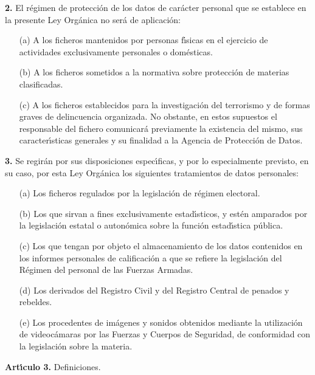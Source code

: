 {\bf 2.} El r\'egimen de protecci\'on de los datos de car\'acter personal que 
se establece en la presente Ley Org\'anica no ser\'a de aplicaci\'on:
\begin{itemize}
\item [(a)] A los ficheros mantenidos por personas f\'{\i}sicas en el ejercicio 
de actividades exclusivamente personales o dom\'esticas.
\item [(b)] A los ficheros sometidos a la normativa sobre protecci\'on de 
 materias clasificadas.
\item [(c)] A los ficheros establecidos para la investigaci\'on del terrorismo 
y de formas graves de delincuencia organizada. No obstante, en estos supuestos 
el responsable del fichero comunicar\'a previamente la existencia del mismo,
sus caracter\'{\i}sticas generales y su finalidad a la Agencia de Protecci\'on 
de Datos.
\end{itemize}

{\bf 3.} Se regir\'an por sus disposiciones espec\'{\i}ficas, y por lo 
especialmente previsto, en su caso, por esta Ley Org\'anica los siguientes 
tratamientos de datos personales:
\begin{itemize}
\item [(a)] Los ficheros regulados por la legislaci\'on de r\'egimen electoral.
\item [(b)] Los que sirvan a fines exclusivamente estad\'{\i}sticos, y est\'en 
amparados por la legislaci\'on estatal o auton\'omica sobre la funci\'on 
estad\'{\i}stica p\'ublica.
\item [(c)] Los que tengan por objeto el almacenamiento de los datos contenidos 
en los informes personales de calificaci\'on a que se refiere la legislaci\'on 
del R\'egimen del personal de las Fuerzas Armadas.
\item [(d)] Los derivados del Registro Civil y del Registro Central de penados 
y rebeldes.
\item [(e)] Los procedentes de im\'agenes y sonidos obtenidos mediante la 
utilizaci\'on de videoc\'amaras por las Fuerzas y Cuerpos de Seguridad,
de conformidad con la legislaci\'on sobre la materia.
\end{itemize}
\vspace{0.3cm}
{\large {\bf Art\'{\i}culo 3.} Definiciones.}

